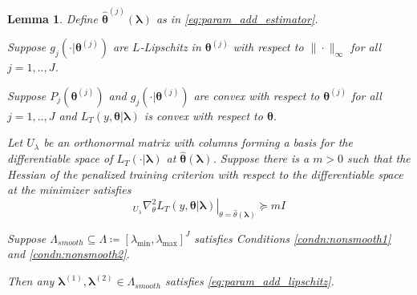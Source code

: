 \documentclass[12pt]{article}
\newtheorem{lemma}{Lemma}
\begin{document}
\begin{lemma}
	\label{lemma:nonsmooth}
		Define $\hat{\boldsymbol{\theta}}^{(j)}\left (\boldsymbol{\lambda}\right )$ as in \eqref{eq:param_add_estimator}.
		
		Suppose $g_j(\cdot| \boldsymbol{\theta}^{(j)})$ are $L$-Lipschitz in $\boldsymbol{\theta}^{(j)}$ with respect to $\| \cdot \|_\infty$ for all $j=1,..,J$.
		
		Suppose $P_j(\boldsymbol{\theta}^{(j)})$ and $g_j(\cdot| \boldsymbol{\theta}^{(j)})$ are convex with respect to $\boldsymbol{\theta}^{(j)}$ for all $j=1,..,J$ and $L_T\left (y, \boldsymbol{\theta} | \boldsymbol{\lambda} \right )$ is convex with respect to $\boldsymbol{\theta}$.
		
		Let $U_\lambda$ be an orthonormal matrix with columns forming a basis for the differentiable space of $L_T(\cdot | \boldsymbol{\lambda})$ at $\hat{\boldsymbol{\theta}}(\boldsymbol{\lambda})$.
		Suppose there is a $m > 0$ such that the Hessian of the penalized training criterion with respect to the differentiable space at the minimizer satisfies 
		\begin{equation}
		\left . _{U_\lambda}\nabla_{\theta}^2 L_T(y, \boldsymbol{\theta} | \boldsymbol{\lambda}) \right |_{\theta = \hat{\theta}(\boldsymbol{\lambda})} \succeq mI
		\end{equation}
		
		Suppose $\Lambda_{smooth} \subseteq \Lambda \coloneqq \left [ \lambda_{\min}, \lambda_{\max} \right ]^J$ satisfies Conditions \ref{condn:nonsmooth1} and \ref{condn:nonsmooth2}.
		
		Then any $\boldsymbol{\lambda}^{(1)}, \boldsymbol{\lambda}^{(2)} \in \Lambda_{smooth}$ satisfies  \eqref{eq:param_add_lipschitz}.
\end{lemma}
\end{document}
